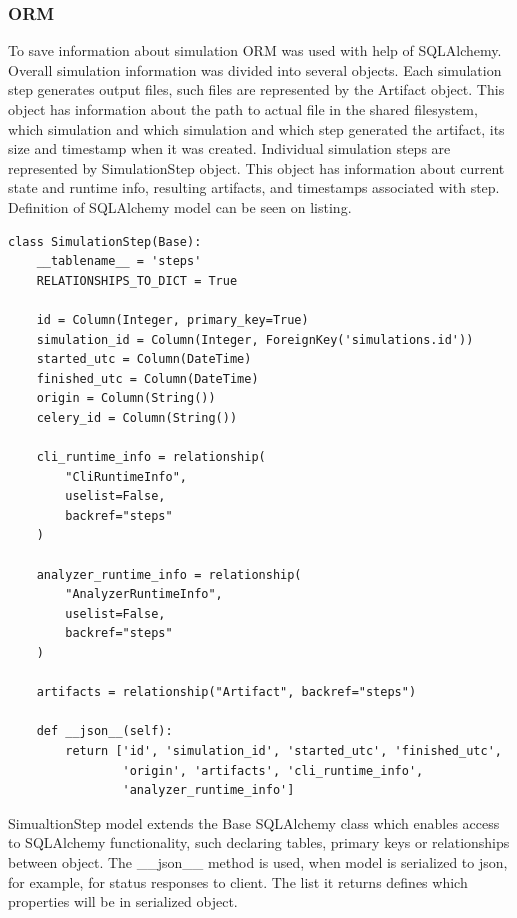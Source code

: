\subsubsection{ORM}
To save information about simulation ORM was used with help of SQLAlchemy. Overall simulation information was divided into several objects. Each simulation step generates output files, such files are represented by the Artifact object. This object has information about the path to actual file in the shared filesystem, which simulation and which simulation and which step generated the artifact, its size and timestamp when it was created. Individual simulation steps are represented by SimulationStep object. This object has information about current state and runtime info, resulting artifacts, and timestamps associated with step. Definition of SQLAlchemy model can be seen on listing.
\begin{lstlisting}[label=list:sp-sqlalchemy,caption=SimulationStep SQLAlchemy model, basicstyle=\footnotesize\ttfamily]
class SimulationStep(Base):
    __tablename__ = 'steps'
    RELATIONSHIPS_TO_DICT = True

    id = Column(Integer, primary_key=True)
    simulation_id = Column(Integer, ForeignKey('simulations.id'))
    started_utc = Column(DateTime)
    finished_utc = Column(DateTime)
    origin = Column(String())
    celery_id = Column(String())
  
    cli_runtime_info = relationship(
        "CliRuntimeInfo", 
        uselist=False, 
        backref="steps"
    )
  
    analyzer_runtime_info = relationship(
        "AnalyzerRuntimeInfo", 
        uselist=False,
        backref="steps"
    )
  
    artifacts = relationship("Artifact", backref="steps")
    
    def __json__(self):
        return ['id', 'simulation_id', 'started_utc', 'finished_utc',
                'origin', 'artifacts', 'cli_runtime_info',
                'analyzer_runtime_info']
\end{lstlisting}
SimualtionStep model extends the Base SQLAlchemy class which enables access to SQLAlchemy functionality, such declaring tables, primary keys or relationships between object. The \_\_json\_\_ method is used, when model is serialized to json, for example, for status responses to client. The list it returns defines which properties will be in serialized object. 
